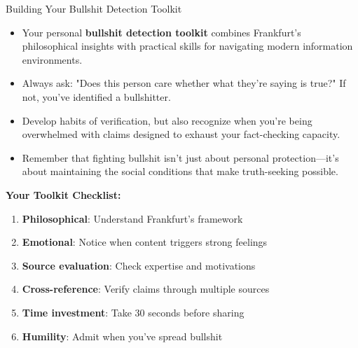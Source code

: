 \documentclass{beamer}
\begin{document}
	\begin{frame}{Building Your Bullshit Detection Toolkit}
		\begin{itemize}
			\item Your personal \textbf{bullshit detection toolkit} combines Frankfurt's philosophical insights with practical skills for navigating modern information environments.
			\item Always ask: "Does this person care whether what they're saying is true?" If not, you've identified a bullshitter.
			\item Develop habits of verification, but also recognize when you're being overwhelmed with claims designed to exhaust your fact-checking capacity.
			\item Remember that fighting bullshit isn't just about personal protection—it's about maintaining the social conditions that make truth-seeking possible.
		\end{itemize}
		
		\begin{example}
			\scriptsize
			\textbf{Your Toolkit Checklist:}
			\begin{enumerate}
				\item \textbf{Philosophical}: Understand Frankfurt's framework
				\item \textbf{Emotional}: Notice when content triggers strong feelings
				\item \textbf{Source evaluation}: Check expertise and motivations
				\item \textbf{Cross-reference}: Verify claims through multiple sources
				\item \textbf{Time investment}: Take 30 seconds before sharing
				\item \textbf{Humility}: Admit when you've spread bullshit
			\end{enumerate}
		\end{example}
	\end{frame}
	
\end{document}
